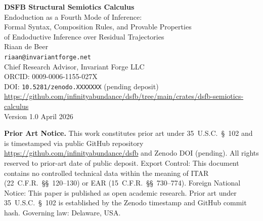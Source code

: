 \documentclass[11pt,a4paper]{article}
\theoremstyle{plain}
\theoremstyle{definition}
\theoremstyle{remark}
\begin{document}

\begin{center}
{\LARGE\bfseries DSFB Structural Semiotics Calculus}\\[0.6em]
{\large Endoduction as a Fourth Mode of Inference:\\
Formal Syntax, Composition Rules, and Provable Properties\\
of Endoductive Inference over Residual Trajectories}\\[1.2em]
{\normalsize Riaan de Beer}\\
{\small\texttt{riaan@invariantforge.net}}\\
{\small Chief Research Advisor, Invariant Forge LLC}\\
{\small ORCID: 0009-0006-1155-027X}\\[0.8em]
{\small DOI: \texttt{10.5281/zenodo.XXXXXXX} \quad (pending deposit)}\\
{\small \url{https://github.com/infinityabundance/dsfb/tree/main/crates/dsfb-semiotics-calculus}}\\[0.5em]
{\small Version 1.0 \quad April 2026}
\end{center}

\vspace{0.5em}
\begin{noticebox}
\textbf{Prior Art Notice.} This work constitutes prior art under 35~U.S.C.~\S~102 and is
timestamped via public GitHub repository \url{https://github.com/infinityabundance/dsfb} and
Zenodo DOI (pending). All rights reserved to prior-art date of public deposit.
Export Control: This document contains no controlled technical data within the meaning of ITAR
(22~C.F.R.~\S\S~120--130) or EAR (15~C.F.R.~\S\S~730--774). Foreign National Notice: This paper is
published as open academic research. Prior art under 35~U.S.C.~\S~102 is established by the Zenodo
timestamp and GitHub commit hash. Governing law: Delaware, USA.
\end{noticebox}
\end{document}

